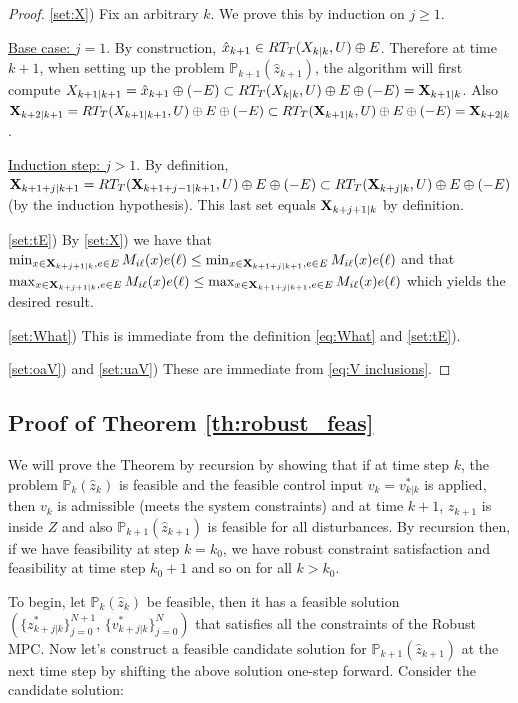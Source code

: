 \begin{proof}
	
\ref{set:X}) 
Fix an arbitrary $k$. We prove this by induction on $j \geq 1$.

\underline{Base case: $j=1$}. By construction, $\hat{x}_{k+1} \in RT_T(X_{k|k},U) \oplus E$.
Therefore at time $k+1$, when setting up the problem $\mathbb{P}_{k+1}(\hat{z}_{k+1})$, the algorithm will first compute
$X_{k+1|k+1} = \hat{x}_{k+1} \oplus (-E)  \subset RT_T(X_{k|k},U) \oplus E \oplus (-E) = \mathbf{X}_{k+1|k}$.
Also 
$\mathbf{X}_{k+2|k+1} = RT_T(X_{k+1|k+1},U) \oplus E \oplus(-E) \subset  RT_T(\mathbf{X}_{k+1|k},U) \oplus E \oplus(-E) = \mathbf{X}_{k+2|k}$.

\underline{Induction step: $j > 1$}.
By definition, $\mathbf{X}_{k+1+j|k+1} = RT_T(\mathbf{X}_{k+1+j-1|k+1},U) \oplus E \oplus (-E) \subset  RT_T(\mathbf{X}_{k+j|k},U) \oplus E \oplus (-E)$ (by the induction hypothesis). This last set equals $\mathbf{X}_{k+j+1|k}$ by definition.

\ref{set:tE}) 	By \ref{set:X}) 
 we have that 
 $ \min_{x \in \mathbf{X}_{k+j+1|k}, e \in E} M_{i\ell}(x)e(\ell) \leq \min_{x \in \mathbf{X}_{k+1+j|k+1}, e \in E} M_{i\ell}(x)e(\ell)$ and that 
 $\max_{x \in \mathbf{X}_{k+j+1|k}, e \in E} M_{i\ell}(x)e(\ell) \leq \max_{x \in \mathbf{X}_{k+1+j|k+1}, e \in E} M_{i\ell}(x)e(\ell)$
 which yields the desired result.
 
 \ref{set:What}) This is immediate from the definition \eqref{eq:What} and \ref{set:tE}).
 
 \ref{set:oaV}) and \ref{set:uaV}) These are immediate from \eqref{eq:V inclusions}.
 
	\end{proof}


\subsection{Proof of Theorem \ref{th:robust_feas}}
\label{sec:proof of thm 1}
We will prove the Theorem by recursion by showing that if at time step $k$, the problem $\mathbb{P}_{k}(\hat{z}_k)$ is feasible and the feasible control input $v_k = v^{*}_{k|k}$ is applied, then $v_k$ is admissible (meets the system constraints) and at time $k+1$, $z_{k+1}$ is inside $Z$ and also $\mathbb{P}_{k+1}(\hat{z}_{k+1})$ is feasible for all disturbances. By recursion then, if we have feasibility at step $k=k_0$, we have robust constraint satisfaction and feasibility at time step $k_0+1$ and so on for all $k>k_0$. 

To begin, let $\mathbb{P}_{k}(\hat{z}_k)$ be feasible, then it has a feasible solution $(\lbrace z^{*}_{k+j|k}\rbrace_{j=0}^{N+1}, \, \lbrace v^{*}_{k+j|k}\rbrace_{j=0}^{N} )$ that satisfies all the constraints of the Robust MPC. 
Now let's construct a feasible candidate solution for $\mathbb{P}_{k+1}(\hat{z}_{k+1})$ at the next time step by shifting the above solution one-step forward. 
Consider the candidate solution:

